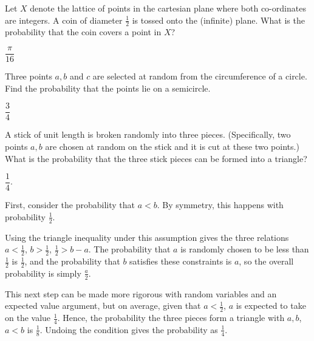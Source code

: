 \documentclass[../main.tex]{subfiles}
\begin{document}
\begin{example}
	Let $X$ denote the lattice of points in the cartesian 
	plane where both co-ordinates are integers. A coin
	of diameter $\frac12$ is tossed onto the (infinite) plane.
	What is the probability that the coin covers a point in $X$?
\end{example}

\begin{solution}[Answer]
	$\dfrac{\pi}{16}$
\end{solution}

\begin{example}
	Three points $a,b$ and $c$ are selected at random from the circumference of a circle. Find the probability that the
	points lie on a semicircle.
\end{example}

\begin{solution}[Answer]
	$\dfrac34$
\end{solution}

\begin{example}
	A stick of unit length is broken randomly into three pieces. (Specifically, two points $a,b$ are chosen at random on the
	stick and it is cut at these two points.) What is the probability
	that the three stick pieces can be formed into a triangle?
\end{example}

\begin{solution}[Answer]
	$\dfrac{1}{4}$. 
\end{solution}

\begin{solution}
First, consider the probability that $a < b$. By symmetry, this happens with probability $\frac{1}{2}$. 

Using the triangle inequality under this assumption gives the three relations $a < \frac{1}{2}$, $b > \frac{1}{2}$, $\frac{1}{2} > b-a$. The probability that $a$ is randomly chosen to be less than $\frac{1}{2}$ is $\frac{1}{2}$, and the probability that $b$ satisfies these constraints is $a$, so the overall probability is simply $\frac{a}{2}$. 

This next step can be made more rigorous with random variables and an expected value argument, but on average, given that $a < \frac 12$, $a$ is expected to take on the value $\frac 14$. Hence, the probability the three pieces form a triangle with $a, b$, $a < b$ is $\frac 18$. Undoing the condition gives the probability as $\frac 14$. 
\end{solution}
\end{document}
